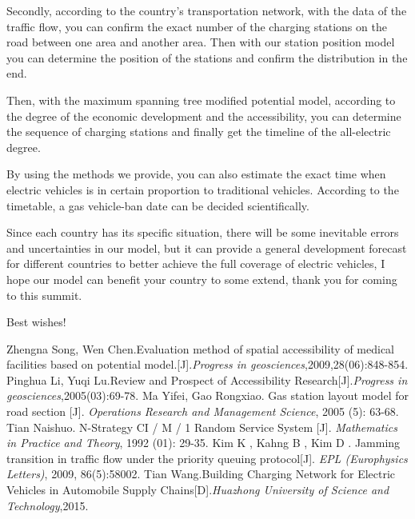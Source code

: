 \documentclass[12pt]{article}  %
\begin{document}
Secondly, according to the country’s transportation network, with the data of the traffic flow, you can confirm the exact number of the charging stations on the road between one area and another area. Then with our station position model you can determine the position of the stations and confirm the distribution in the end.

Then, with the maximum spanning tree modified potential model, according to the degree of the economic development and the accessibility, you can determine the sequence of charging stations and finally get the timeline of the all-electric degree.

By using the methods we provide, you can also estimate the exact time when electric vehicles is in certain proportion to traditional vehicles. According to the timetable, a gas vehicle-ban date can be decided scientifically.

Since each country has its specific situation, there will be some inevitable errors and uncertainties in our model, but it can provide a general development forecast for different countries to better achieve the full coverage of electric vehicles, I hope our model can benefit your country to some extend, thank you for coming to this summit.

Best wishes!
\clearpage
\begin{thebibliography}{99}
Zhengna Song, Wen Chen.Evaluation method of spatial accessibility of medical facilities based on potential model.[J].\emph{Progress in geosciences},2009,28(06):848-854.
Pinghua Li, Yuqi Lu.Review and Prospect of Accessibility Research[J].\emph{Progress in geosciences},2005(03):69-78.
Ma Yifei, Gao Rongxiao. Gas station layout model for road section [J]. \emph{Operations Research and Management Science}, 2005 (5): 63-68.
Tian Naishuo. N-Strategy CI / M / 1 Random Service System [J]. \emph{Mathematics in Practice and Theory}, 1992 (01): 29-35.
Kim K , Kahng B , Kim D . Jamming transition in traffic flow under the priority queuing protocol[J]. \emph{EPL (Europhysics Letters)}, 2009, 86(5):58002.
Tian Wang.Building Charging Network for Electric Vehicles in Automobile Supply Chains[D].\emph{Huazhong University of Science and Technology},2015.
\end{thebibliography}
\end{document}
